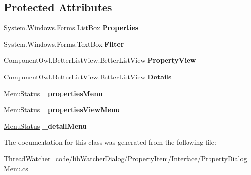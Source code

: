 \subsection*{Protected Attributes}
\begin{DoxyCompactItemize}
\item 
\hypertarget{classlib_watcher_dialog_1_1_property_item_1_1_property_dialog_menu_a0915e0f5828a209d50433ecc54bf94b4}{System.\+Windows.\+Forms.\+List\+Box {\bfseries Properties}}\label{classlib_watcher_dialog_1_1_property_item_1_1_property_dialog_menu_a0915e0f5828a209d50433ecc54bf94b4}

\item 
\hypertarget{classlib_watcher_dialog_1_1_property_item_1_1_property_dialog_menu_a07a7a4d8a92df0773bec74dffdd3d49b}{System.\+Windows.\+Forms.\+Text\+Box {\bfseries Filter}}\label{classlib_watcher_dialog_1_1_property_item_1_1_property_dialog_menu_a07a7a4d8a92df0773bec74dffdd3d49b}

\item 
\hypertarget{classlib_watcher_dialog_1_1_property_item_1_1_property_dialog_menu_adc4982493c73676373490a1bc7ca5bd6}{Component\+Owl.\+Better\+List\+View.\+Better\+List\+View {\bfseries Property\+View}}\label{classlib_watcher_dialog_1_1_property_item_1_1_property_dialog_menu_adc4982493c73676373490a1bc7ca5bd6}

\item 
\hypertarget{classlib_watcher_dialog_1_1_property_item_1_1_property_dialog_menu_a8d494690560f3d14563e5432967067c9}{Component\+Owl.\+Better\+List\+View.\+Better\+List\+View {\bfseries Details}}\label{classlib_watcher_dialog_1_1_property_item_1_1_property_dialog_menu_a8d494690560f3d14563e5432967067c9}

\item 
\hypertarget{classlib_watcher_dialog_1_1_property_item_1_1_property_dialog_menu_a16d8e7d0686e50d81f6e7be2dc1549dd}{\hyperlink{classlib_watcher_dialog_1_1_property_item_1_1_menu_status}{Menu\+Status} {\bfseries \+\_\+properties\+Menu}}\label{classlib_watcher_dialog_1_1_property_item_1_1_property_dialog_menu_a16d8e7d0686e50d81f6e7be2dc1549dd}

\item 
\hypertarget{classlib_watcher_dialog_1_1_property_item_1_1_property_dialog_menu_a6683b52d45e51ee8d1bf7db666b2762c}{\hyperlink{classlib_watcher_dialog_1_1_property_item_1_1_menu_status}{Menu\+Status} {\bfseries \+\_\+properties\+View\+Menu}}\label{classlib_watcher_dialog_1_1_property_item_1_1_property_dialog_menu_a6683b52d45e51ee8d1bf7db666b2762c}

\item 
\hypertarget{classlib_watcher_dialog_1_1_property_item_1_1_property_dialog_menu_acbb4b3f7e457df77e4fa3b5c4327d7d4}{\hyperlink{classlib_watcher_dialog_1_1_property_item_1_1_menu_status}{Menu\+Status} {\bfseries \+\_\+detail\+Menu}}\label{classlib_watcher_dialog_1_1_property_item_1_1_property_dialog_menu_acbb4b3f7e457df77e4fa3b5c4327d7d4}

\end{DoxyCompactItemize}


The documentation for this class was generated from the following file\+:\begin{DoxyCompactItemize}
\item 
Thread\+Watcher\+\_\+code/lib\+Watcher\+Dialog/\+Property\+Item/\+Interface/Property\+Dialog\+Menu.\+cs\end{DoxyCompactItemize}
